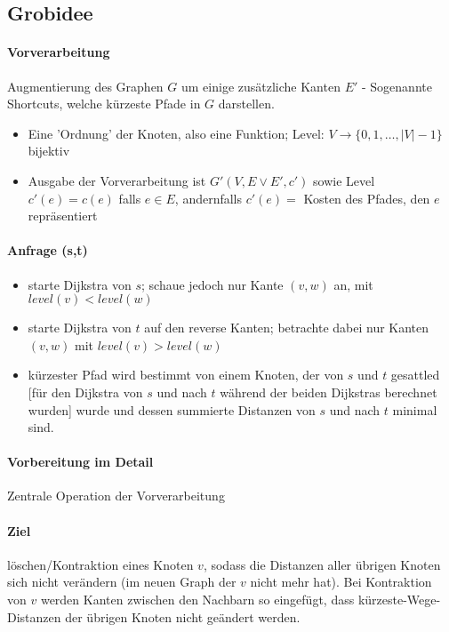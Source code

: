 \subsection{Grobidee}
\paragraph*{Vorverarbeitung}  Augmentierung des Graphen $G$ um einige zusätzliche Kanten $E'$ - Sogenannte Shortcuts, welche kürzeste Pfade in $G$ darstellen.
\begin{itemize}
	\item Eine 'Ordnung' der Knoten, also eine Funktion; Level: $V \rightarrow \{ 0,1,\dots,|V|-1 \}$ bijektiv
	\item Ausgabe der Vorverarbeitung ist $G'(V,E \lor E',c')$ sowie Level $c'(e)=c(e)$ falls $e \in E$, andernfalls $c'(e) =$ Kosten des Pfades, den $e$ repräsentiert
\end{itemize}

\paragraph*{Anfrage (s,t)}
\begin{itemize}
	\item starte Dijkstra von $s$; schaue jedoch nur Kante $(v,w)$ an, mit $level(v)<level(w)$
	\item starte Dijkstra von $t$ auf den reverse Kanten; betrachte dabei nur Kanten $(v,w)$ mit $level(v)>level(w)$
	\item kürzester Pfad wird bestimmt von einem Knoten, der von $s$ und $t$ gesattled [für den Dijkstra von $s$ und nach $t$ während der beiden Dijkstras berechnet wurden] wurde und dessen summierte Distanzen von $s$ und nach $t$ minimal sind.
\end{itemize}

\paragraph*{Vorbereitung im Detail} Zentrale Operation der Vorverarbeitung %

\paragraph*{Ziel} löschen/Kontraktion eines Knoten $v$, sodass die Distanzen aller übrigen Knoten sich nicht verändern (im neuen Graph der $v$ nicht mehr hat). Bei Kontraktion von $v$ werden Kanten zwischen den Nachbarn so eingefügt, dass kürzeste-Wege-Distanzen der übrigen Knoten nicht geändert werden.

